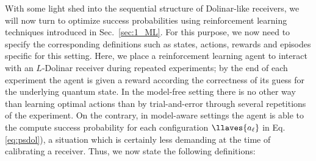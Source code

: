 With some light shed into the sequential structure of Dolinar-like receivers, we will now turn to optimize success probabilities using reinforcement learning techniques introduced in Sec.~\ref{sec:1_ML}. For this purpose, we now need to specify the corresponding definitions such as states, actions, rewards and episodes specific for this setting. Here, we place a reinforcement learning agent to interact with an $L$-Dolinar receiver during repeated experiments; by the end of each experiment the agent is given a reward according the correctness of its guess for the underlying quantum state. In the model-free setting there is no other way than learning optimal actions than by trial-and-error through several repetitions of the experiment. On the contrary, in model-aware settings the agent is able to the compute success probability for each configuration $\llaves{a_\ell}$ in Eq.\ref{eq:psdol}), a situation which is certainly less demanding at the time of calibrating a receiver. Thus, we now state the following definitions:
